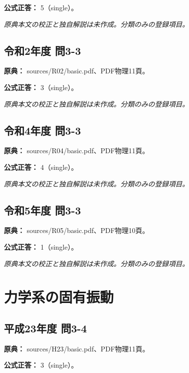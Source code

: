 \textbf{公式正答：} 5（single）。

\par\textit{原典本文の校正と独自解説は未作成。分類のみの登録項目。}

\subsection{令和2年度 問3-3}
\label{q:r02-reg-basic-3-3}

\noindent\textbf{原典：} sources/R02/basic.pdf、PDF物理11頁。

\textbf{公式正答：} 3（single）。

\par\textit{原典本文の校正と独自解説は未作成。分類のみの登録項目。}

\subsection{令和4年度 問3-3}
\label{q:r04-reg-basic-3-3}

\noindent\textbf{原典：} sources/R04/basic.pdf、PDF物理11頁。

\textbf{公式正答：} 4（single）。

\par\textit{原典本文の校正と独自解説は未作成。分類のみの登録項目。}

\subsection{令和5年度 問3-3}
\label{q:r05-reg-basic-3-3}

\noindent\textbf{原典：} sources/R05/basic.pdf、PDF物理10頁。

\textbf{公式正答：} 1（single）。

\par\textit{原典本文の校正と独自解説は未作成。分類のみの登録項目。}

\section{力学系の固有振動}

\subsection{平成23年度 問3-4}
\label{q:h23-reg-basic-3-4}

\noindent\textbf{原典：} sources/H23/basic.pdf、PDF物理11頁。

\textbf{公式正答：} 3（single）。

